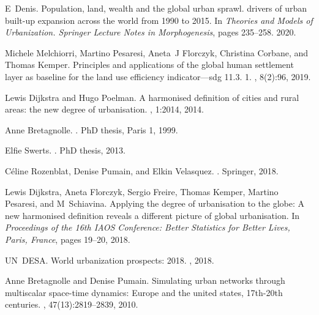 \documentclass[11pt]{article}
\begin{document}
\begin{thebibliography}{10}
E~Denis.
\newblock Population, land, wealth and the global urban sprawl. drivers of
  urban built-up expansion across the world from 1990 to 2015.
\newblock In {\em Theories and Models of Urbanization. Springer Lecture Notes
  in Morphogenesis}, pages 235--258. 2020.

Michele Melchiorri, Martino Pesaresi, Aneta~J Florczyk, Christina Corbane, and
  Thomas Kemper.
\newblock Principles and applications of the global human settlement layer as
  baseline for the land use efficiency indicator—sdg 11.3. 1.
, 8(2):96, 2019.

Lewis Dijkstra and Hugo Poelman.
\newblock A harmonised definition of cities and rural areas: the new degree of
  urbanisation.
, 1:2014, 2014.

Anne Bretagnolle.
.
\newblock PhD thesis, Paris 1, 1999.

Elfie Swerts.
.
\newblock PhD thesis, 2013.

C{\'e}line Rozenblat, Denise Pumain, and Elkin Velasquez.
.
\newblock Springer, 2018.

Lewis Dijkstra, Aneta Florczyk, Sergio Freire, Thomas Kemper, Martino Pesaresi,
  and M~Schiavina.
\newblock Applying the degree of urbanisation to the globe: A new harmonised
  definition reveals a different picture of global urbanisation.
\newblock In {\em Proceedings of the 16th IAOS Conference: Better Statistics
  for Better Lives, Paris, France}, pages 19--20, 2018.

UN~DESA.
\newblock World urbanization prospects: 2018.
,
  2018.

Anne Bretagnolle and Denise Pumain.
\newblock Simulating urban networks through multiscalar space-time dynamics:
  Europe and the united states, 17th-20th centuries.
, 47(13):2819--2839, 2010.


\end{thebibliography}
\end{document}

